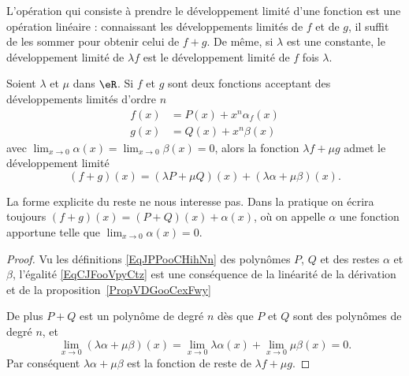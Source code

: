 L'opération qui consiste à prendre le développement limité d'une fonction est une opération linéaire : connaissant les développements limités de \( f\) et de \( g\), il suffit de les sommer pour obtenir celui de \( f+g\). De m\^eme, si $\lambda$ est une constante, le développement limité de $\lambda f$ est le développement limité de $f$ fois $\lambda$.
\begin{proposition}
Soient $\lambda$ et $\mu$ dans $\eR$.  Si \( f\) et \( g\) sont deux fonctions acceptant des développements limités d'ordre \( n\)
    \begin{subequations}    \label{EqJPPooCHihNn}
        \begin{align}
            f(x)&=P(x)+x^n\alpha_f(x)\\
            g(x)&=Q(x)+x^n\beta(x)
        \end{align}
    \end{subequations}
    avec \( \lim_{x\to 0} \alpha(x)=\lim_{x\to 0} \beta(x)=0\), alors la fonction \( \lambda f+\mu g\) admet le développement limité
    \begin{equation}    \label{EqCJFooVpyCtz}
        (f+g)(x)=(\lambda P+\mu Q)(x)+(\lambda \alpha+\mu\beta)(x).
    \end{equation}
\end{proposition}
\begin{remark}
  La forme explicite du reste ne nous interesse pas. Dans la pratique on écrira toujours $(f+g)(x)=(P+Q)(x)+\alpha(x)$, où on appelle $\alpha$ une fonction apportune telle que $\lim_{x\to 0} \alpha(x)=0$.
\end{remark}
\begin{proof}
    Vu les définitions \eqref{EqJPPooCHihNn} des polynômes \( P\), \( Q\) et des restes \( \alpha\) et \( \beta\), l'égalité \eqref{EqCJFooVpyCtz} est une conséquence de la linéarité de la dérivation et de la proposition~\ref{PropVDGooCexFwy}

    De plus \( P+Q\) est un polynôme de degré \( n\) dès que \( P\) et \( Q\) sont des polynômes de degré \( n\), et
    \begin{equation}
        \lim_{x\to 0} (\lambda \alpha+\mu\beta)(x)=\lim_{x\to 0} \lambda\alpha(x)+\lim_{x\to 0} \mu\beta(x)=0.
    \end{equation}
    Par conséquent \(\lambda \alpha+\mu\beta\) est la fonction de reste de \( \lambda f+\mu g\).
\end{proof}

